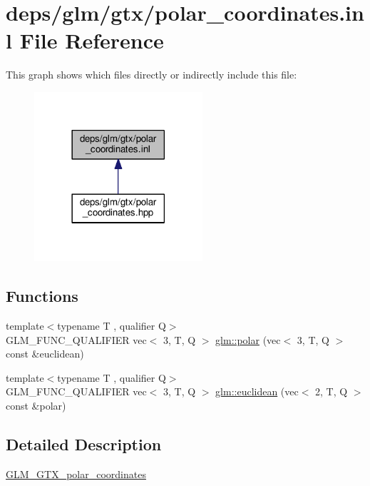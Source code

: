 \hypertarget{polar__coordinates_8inl}{}\section{deps/glm/gtx/polar\+\_\+coordinates.inl File Reference}
\label{polar__coordinates_8inl}
This graph shows which files directly or indirectly include this file\+:
\nopagebreak
\begin{figure}[H]
\begin{center}
\leavevmode
\includegraphics[width=177pt]{da/d69/polar__coordinates_8inl__dep__incl}
\end{center}
\end{figure}
\subsection*{Functions}
\begin{DoxyCompactItemize}
\item 
{\footnotesize template$<$typename T , qualifier Q$>$ }\\G\+L\+M\+\_\+\+F\+U\+N\+C\+\_\+\+Q\+U\+A\+L\+I\+F\+I\+ER vec$<$ 3, T, Q $>$ \hyperlink{group__gtx__polar__coordinates_gab83ac2c0e55b684b06b6c46c28b1590d}{glm\+::polar} (vec$<$ 3, T, Q $>$ const \&euclidean)
\item 
{\footnotesize template$<$typename T , qualifier Q$>$ }\\G\+L\+M\+\_\+\+F\+U\+N\+C\+\_\+\+Q\+U\+A\+L\+I\+F\+I\+ER vec$<$ 3, T, Q $>$ \hyperlink{group__gtx__polar__coordinates_ga1821d5b3324201e60a9e2823d0b5d0c8}{glm\+::euclidean} (vec$<$ 2, T, Q $>$ const \&polar)
\end{DoxyCompactItemize}


\subsection{Detailed Description}
\hyperlink{group__gtx__polar__coordinates}{G\+L\+M\+\_\+\+G\+T\+X\+\_\+polar\+\_\+coordinates} 